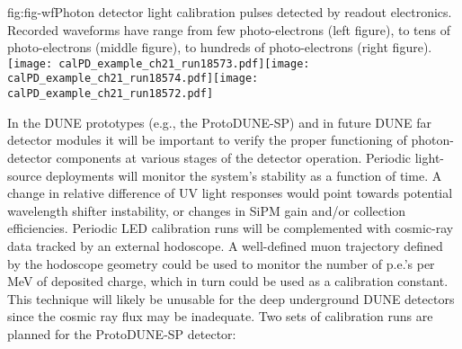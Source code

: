 %
 \begin{cdrfigure}{fig:fig-wf}{Photon detector light calibration pulses detected by readout electronics. Recorded waveforms have range from few photo-electrons (left figure), to tens of photo-electrons (middle figure), to hundreds of photo-electrons (right figure).}
\texttt{[image: calPD\_example\_ch21\_run18573.pdf]}\texttt{[image: calPD\_example\_ch21\_run18574.pdf]}\texttt{[image: calPD\_example\_ch21\_run18572.pdf]}
\end{cdrfigure}
%
In the DUNE prototypes (e.g., the ProtoDUNE-SP) and in future DUNE far detector modules it will be important to %
verify the proper functioning of photon-detector components %
at various stages of the detector operation. 
Periodic light-source deployments will monitor the system's stability as a function of time. A change in relative difference of UV light responses would point towards potential wavelength shifter instability, 
or changes in SiPM gain and/or collection efficiencies. %
Periodic LED calibration runs will be complemented 
with cosmic-ray data tracked by an external hodoscope. 
A well-defined muon trajectory defined by the hodoscope geometry could be used to monitor the number of p.e.'s per MeV of deposited charge, which in turn 
could be used as a calibration constant. This technique will likely be unusable 
for the deep underground DUNE detectors since the cosmic ray flux may be inadequate. %
	Two sets of calibration runs are planned for the ProtoDUNE-SP detector: 
